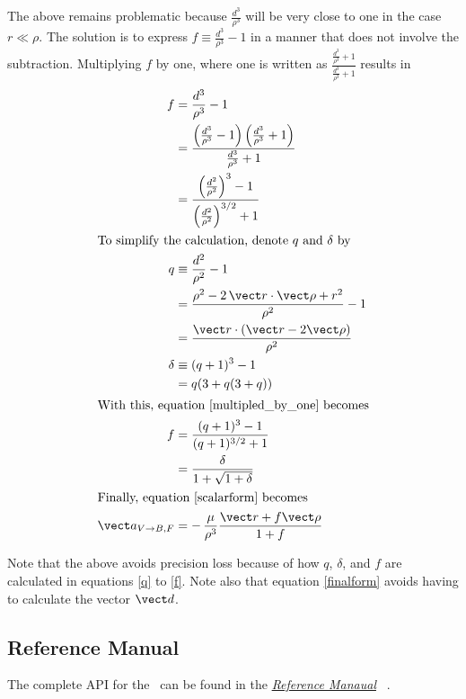 The above remains problematic because $\frac {d^3}{\rho^3}$ will be very
close to one in the case $r \ll \rho$.
The solution is to express $f \equiv \frac {d^3}{\rho^3} - 1$ in a manner that
does not involve the subtraction.
Multiplying $f$ by one, where one is written as
$\frac{\frac {d^3}{\rho^3} + 1}{\frac {d^3}{\rho^3} + 1}$
results in
\begin{align}
f &= \frac {d^3}{\rho^3} - 1 \nonumber \\
  &= \frac {\left(\frac {d^3}{\rho^3} - 1\right)
            \left(\frac {d^3}{\rho^3} + 1\right)} 
           {\frac {d^3}{\rho^3} + 1} \nonumber \\
  &= \frac {\left(\frac {d^2}{\rho^2}\right)^3 - 1}
           {\left(\frac {d^2}{\rho^2}\right)^{3/2} + 1}
\label{multipled_by_one} \\
\intertext{To simplify the calculation, denote $q$ and $\delta$ by}
q &\equiv \frac {d^2}{\rho^2} - 1 \nonumber \\
&= \frac{\rho^2 - 2\,\vect r \cdot \vect \rho + r^2}{\rho^2} - 1 \nonumber \\
& = \frac{\vect r \cdot (\vect r - 2 \vect \rho)}{\rho^2} \label{q} \\
\delta &\equiv (q+1)^3 - 1 \nonumber \\
&= q(3+q(3+q)) \label{delta} \\
\intertext{With this, equation \eqref{multipled_by_one} becomes}
f &=
\frac {(q+1)^3 - 1}{(q+1)^{3/2} + 1} \nonumber \\
&= \frac{\delta}{1+\sqrt{1+\delta}} \label{f} \\
\intertext{Finally, equation \eqref{scalarform} becomes}
\vect a_{V\to B,F}
  &= -\,\frac {\mu}{\rho^3} \frac{\vect r + f \vect \rho}{1+f}
\label{finalform}
\end{align}

Note that the above avoids precision loss because of how $q$, $\delta$,
and $f$ are calculated in equations \eqref{q} to \eqref{f}.
Note also that equation \eqref{finalform} avoids having to calculate the
vector $\vect d$.

\subsection{Reference Manual}

The complete API for the \ModelDesc\ can be found in the
\href{file:refman.pdf}{\em Reference Manaual} ~\cite{gravity_refman}.

\clearpage
\boilerplateinventory


